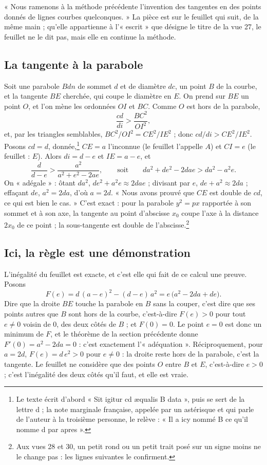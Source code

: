 \documentclass[11pt,a4paper]{article}
\begin{document}
« Nous ramenons à la méthode précédente l'invention des tangentes en des
points donnés de lignes courbes quelconques. » La pièce est sur le feuillet qui
suit, de la même main ; qu'elle appartienne à l'« escrit » que désigne le titre
de la vue 27, le feuillet ne le dit pas, mais elle en continue la méthode.

\subsection*{La tangente à la parabole}

Soit une parabole $Bdn$ de sommet $d$ et de diamètre $dc$, un point $B$ de la
courbe, et la tangente $BE$ cherchée, qui coupe le diamètre en $E$. On prend
sur $BE$ un point $O$, et l'on mène les ordonnées $OI$ et $BC$. Comme $O$ est
hors de la parabole,
\[ \frac{cd}{di} > \frac{BC^2}{OI^2} , \]
et, par les triangles semblables, $BC^2/OI^2 = CE^2/IE^2$ ; donc
$cd/di > CE^2/IE^2$. Posons $cd = d$, donnée,\footnote{Le texte écrit d'abord
« Sit igitur cd æqualis B data », puis se sert de la lettre d ; la note
marginale française, appelée par un astérisque et qui parle de l'auteur à la
troisième personne, le relève : « Il a icy nommé B ce qu'il nomme d par
apres ».} $CE = a$ l'inconnue (le feuillet l'appelle $A$) et $CI = e$ (le
feuillet : $E$). Alors $di = d - e$ et $IE = a - e$, et
\[ \frac{d}{d - e} > \frac{a^2}{a^2 + e^2 - 2ae} ,
   \qquad\text{soit}\qquad
   d a^2 + d e^2 - 2dae > d a^2 - a^2 e . \]
On « adégale » : ôtant $da^2$, $de^2 + a^2 e \approx 2dae$ ; divisant par $e$,
$de + a^2 \approx 2da$ ; effaçant $de$, $a^2 = 2da$, d'où $a = 2d$. « Nous avons
prouvé que $CE$ est double de $cd$, ce qui est bien le cas. » C'est exact : pour
la parabole $y^2 = px$ rapportée à son sommet et à son axe, la tangente au
point d'abscisse $x_0$ coupe l'axe à la distance $2x_0$ de ce point ; la
sous-tangente est double de l'abscisse.\footnote{Aux vues 28 et 30, un petit rond
ou un petit trait posé sur un signe moins ne le change pas : les lignes
suivantes le confirment.}

\subsection*{Ici, la règle est une démonstration}

L'inégalité du feuillet est exacte, et c'est elle qui fait de ce calcul une
preuve. Posons
\[ F(e) = d\,(a - e)^2 - (d - e)\,a^2 = e\,\bigl(a^2 - 2da + de\bigr) . \]
Dire que la droite $BE$ touche la parabole en $B$ sans la couper, c'est dire
que ses points autres que $B$ sont hors de la courbe, c'est-à-dire $F(e) > 0$
pour tout $e \neq 0$ voisin de $0$, des deux côtés de $B$ ; et $F(0) = 0$. Le
point $e = 0$ est donc un minimum de $F$, et le théorème de la section
précédente donne $F'(0) = a^2 - 2da = 0$ : c'est exactement l'« adéquation ».
Réciproquement, pour $a = 2d$, $F(e) = d\,e^2 > 0$ pour $e \neq 0$ : la droite
reste hors de la parabole, c'est la tangente. Le feuillet ne considère que des
points $O$ entre $B$ et $E$, c'est-à-dire $e > 0$ ; c'est l'inégalité des deux
côtés qu'il faut, et elle est vraie.
\end{document}
